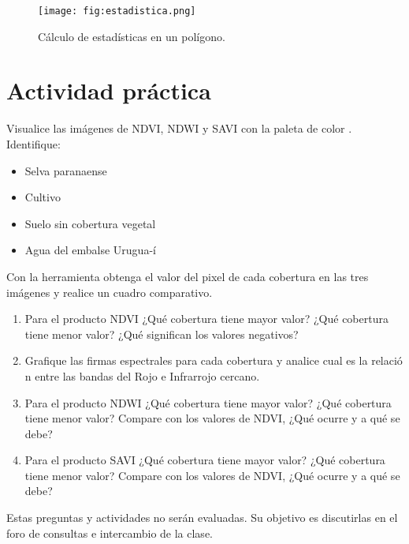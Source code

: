 \begin{figure}[h!]
    \centering
    \texttt{[image: fig:estadistica.png]}
    \caption{Cálculo de estadísticas en un polígono.}
    \label{fig:estadistica-b}
\end{figure}


\section{Actividad práctica}

Visualice las imágenes de NDVI, NDWI y SAVI con la paleta de color . Identifique:

  \begin{itemize}
  \item Selva paranaense
  \item Cultivo
  \item Suelo sin cobertura vegetal
  \item Agua del embalse Urugua-í
  \end{itemize}

Con la herramienta  obtenga el valor del pixel de cada cobertura en las tres imágenes y realice un cuadro comparativo.

\begin{enumerate}
\item Para el producto NDVI ¿Qué cobertura tiene mayor valor? ¿Qué cobertura tiene menor valor? ¿Qué significan los valores negativos?
\item Grafique las firmas espectrales para cada cobertura y analice cual es la relació n entre las bandas del Rojo e Infrarrojo cercano.
\item Para el producto NDWI ¿Qué cobertura tiene mayor valor? ¿Qué cobertura tiene menor valor? Compare con los valores de NDVI, ¿Qué ocurre y a qué se debe?
\item Para el producto SAVI ¿Qué cobertura tiene mayor valor? ¿Qué cobertura tiene menor valor? Compare con los valores de NDVI, ¿Qué ocurre y a qué se debe?

\end{enumerate}



Estas preguntas y actividades no serán evaluadas. Su objetivo es discutirlas en el foro de consultas e intercambio de la clase.



